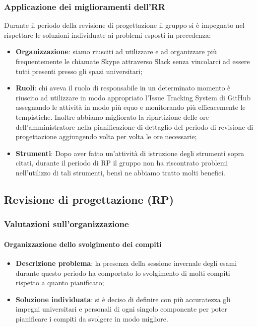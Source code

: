 		\subsubsection{Applicazione dei miglioramenti dell'RR}
			Durante il periodo della revisione di progettazione il gruppo si è impegnato nel rispettare le soluzioni individuate ai problemi esposti in precedenza:
			\begin{itemize}
				\item \textbf{Organizzazione}: siamo riusciti ad utilizzare e ad organizzare più frequentemente le chiamate Skype attraverso Slack senza vincolarci ad essere tutti presenti presso gli spazi universitari;
				\item \textbf{Ruoli}: chi aveva il ruolo di responsabile in un determinato momento è riuscito ad utilizzare in modo appropriato l'Issue Tracking System di GitHub assegnando le attività in modo più equo e monitorando più efficacemente le tempistiche. Inoltre abbiamo migliorato la ripartizione delle ore dell'amministratore nella pianificazione di dettaglio del periodo di revisione di progettazione aggiungendo volta per volta le ore necessarie;
				\item \textbf{Strumenti}: Dopo aver fatto un'attività di istruzione degli strumenti sopra citati, durante il periodo di RP il gruppo non ha riscontrato problemi nell'utilizzo di tali strumenti, bensì ne abbiamo tratto molti benefici.
			\end{itemize}
	\subsection{Revisione di progettazione (RP)}
		\subsubsection{Valutazioni sull'organizzazione}
			\paragraph{Organizzazione dello svolgimento dei compiti}
				\begin{itemize}
					\item \textbf{Descrizione problema}: la presenza della sessione invernale degli esami durante questo periodo ha comportato lo svolgimento di molti compiti rispetto a quanto pianificato;
					\item \textbf{Soluzione individuata}: si è deciso di definire con più accuratezza gli impegni universitari e personali di ogni singolo componente per poter pianificare i compiti da svolgere in modo migliore.
				\end{itemize}
